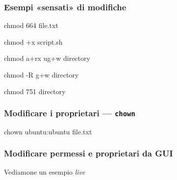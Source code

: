 \documentclass{beamer}
\newenvironment{shell*}{\par\vspace{.5em}\begin{beamercolorbox}[rounded=true,sep=.2em]{shell snippet}\ttfamily {\color{red}\#}}{\end{beamercolorbox}}
\begin{document}
\begin{frame}[t]
  \frametitle{Esempi «sensati» di modifiche}
  \begin{shell*}
    chmod 664 file.txt
  \end{shell*}

  \begin{shell*}
    chmod +x script.sh
  \end{shell*}

  \begin{shell*}
    chmod a+rx ug+w directory
  \end{shell*}

  \begin{shell*}
    chmod -R g+w directory
  \end{shell*}

  \begin{shell*}
    chmod 751 directory
  \end{shell*}

\end{frame}

\begin{frame}
  \frametitle{Modificare i proprietari --- \texttt{chown}}

  \begin{shell*}
    chown \alert<2>{ubuntu}:\alert<3>{ubuntu} file.txt
  \end{shell*}
  
\end{frame}

\begin{frame}
  \frametitle{Modificare permessi e proprietari da GUI}
  
  Vediamone un esempio \textit{live}
\end{frame}
\end{document}
